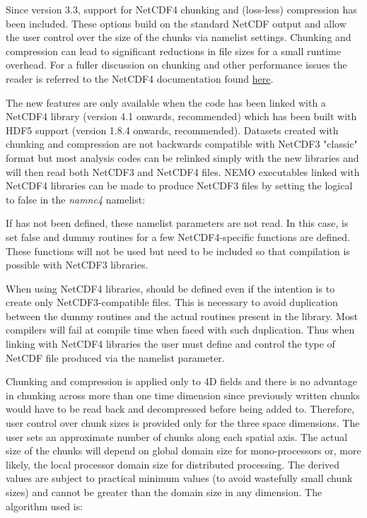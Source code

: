 Since version 3.3, support for NetCDF4 chunking and (loss-less) compression has
been included.  These options build on the standard NetCDF output and allow
the user control over the size of the chunks via namelist settings. Chunking
and compression can lead to significant reductions in file sizes for a small
runtime overhead. For a fuller discussion on chunking and other performance
issues the reader is referred to the NetCDF4 documentation found 
\href{http://www.unidata.ucar.edu/software/netcdf/docs/netcdf.html#Chunking}{here}.

The new features are only available when the code has been linked with a
NetCDF4 library (version 4.1 onwards, recommended) which has been built
with HDF5 support (version 1.8.4 onwards, recommended). Datasets created
with chunking and compression are not backwards compatible with NetCDF3
"classic" format but most analysis codes can be relinked simply with the
new libraries and will then read both NetCDF3 and NetCDF4 files. NEMO
executables linked with NetCDF4 libraries can be made to produce NetCDF3
files by setting the  logical to false in the \textit{namnc4} 
namelist:


If  has not been defined, these namelist parameters are not read. 
In this case,  is set false and dummy routines for a few
NetCDF4-specific functions are defined. These functions will not be used but
need to be included so that compilation is possible with NetCDF3 libraries.

When using NetCDF4 libraries,  should be defined even if the
intention is to create only NetCDF3-compatible files. This is necessary to
avoid duplication between the dummy routines and the actual routines present
in the library. Most compilers will fail at compile time when faced with
such duplication. Thus when linking with NetCDF4 libraries the user must
define  and control the type of NetCDF file produced via the
namelist parameter.

Chunking and compression is applied only to 4D fields and there is no
advantage in chunking across more than one time dimension since previously
written chunks would have to be read back and decompressed before being
added to. Therefore, user control over chunk sizes is provided only for the
three space dimensions. The user sets an approximate number of chunks along
each spatial axis. The actual size of the chunks will depend on global domain
size for mono-processors or, more likely, the local processor domain size for
distributed processing. The derived values are subject to practical minimum
values (to avoid wastefully small chunk sizes) and cannot be greater than the
domain size in any dimension. The algorithm used is:

